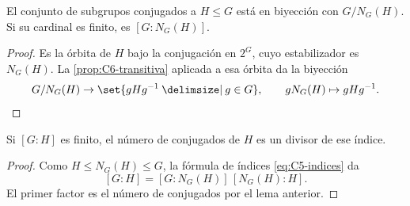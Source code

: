 \begin{lema}\label{lema:C6-conjugados}
El conjunto de subgrupos conjugados a $H\le G$ está en biyección con $G/N_G(H)$. Si su cardinal es finito, es $[G:N_G(H)]$.
\end{lema}
\begin{proof}
Es la órbita de $H$ bajo la conjugación en $2^G$, cuyo estabilizador es $N_G(H)$. La \cref{prop:C6-transitiva} aplicada a esa órbita da la biyección
\[
G/N_G(H)\to\set{gHg^{-1}\given g\in G},\qquad
gN_G(H)\mapsto gHg^{-1}.\qedhere
\]
\end{proof}
\begin{coro}
Si $[G:H]$ es finito, el número de conjugados de $H$ es un divisor de ese índice.
\end{coro}
\begin{proof}
Como $H\le N_G(H)\le G$, la fórmula de índices \eqref{eq:C5-indices} da
\[
[G:H]=[G:N_G(H)]\,[N_G(H):H].
\]
El primer factor es el número de conjugados por el lema anterior.
\end{proof}
